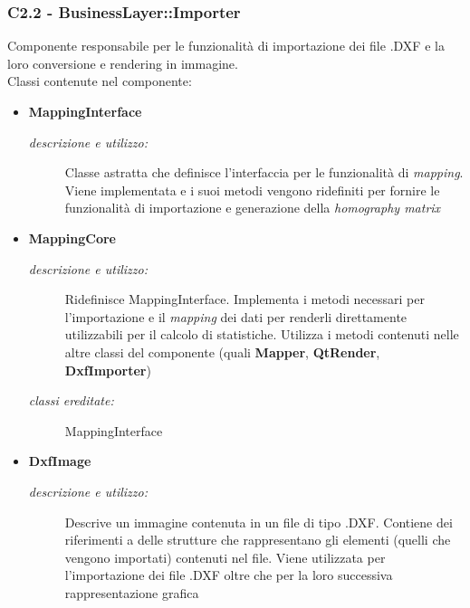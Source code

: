 \subsubsection{C2.2 - BusinessLayer::Importer} \label{sec:c2.2}
Componente responsabile per le funzionalità di importazione dei file .DXF e la loro conversione e rendering in immagine. \\
Classi contenute nel componente: 
\begin{itemize} 
\item \textbf{MappingInterface}
\begin{description}
\item [\textit{descrizione e utilizzo:}] Classe astratta che definisce l'interfaccia per le funzionalità di \textit{mapping}. Viene implementata e i suoi metodi vengono ridefiniti per fornire le funzionalità di importazione e generazione della \textit{homography matrix}
\end{description}
\item \textbf{MappingCore}
\begin{description}
\item [\textit{descrizione e utilizzo:}] Ridefinisce MappingInterface. Implementa i metodi necessari per l'importazione e il \textit{mapping} dei dati per renderli direttamente utilizzabili per il calcolo di statistiche. Utilizza i metodi contenuti nelle altre classi del componente (quali \textbf{Mapper}, \textbf{QtRender}, \textbf{DxfImporter})
\item [\textit{classi ereditate:}] MappingInterface
\end{description}
\item \textbf{DxfImage}
\begin{description}
\item [\textit{descrizione e utilizzo:}] Descrive un immagine contenuta in un file di tipo .DXF. Contiene dei riferimenti a delle strutture che rappresentano gli elementi (quelli che vengono importati) contenuti nel file. Viene utilizzata per l'importazione dei file .DXF oltre che per la loro successiva rappresentazione grafica


\end{description}
\end{itemize}

